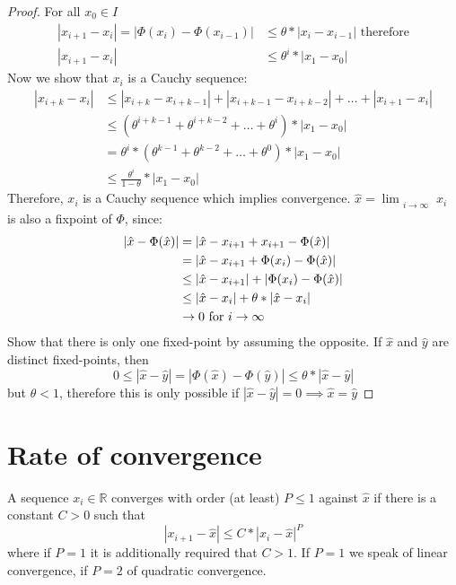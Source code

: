 \begin{proof}
    For all $x_0 \in I$
    \begin{align*}
        |x_{i+1}-x_i|=|\Phi(x_{i})-\Phi(x_{i-1})| &\leq  \theta * |x_i-x_{i-1}| \text{ therefore}\\
        |x_{i+1}-x_i| &\leq \theta^i*|x_1-x_0|
    \end{align*}
    Now we show that $x_i$ is a Cauchy sequence:
    \begin{align*}
        |x_{i+k}-x_i| &\leq |x_{i+k}-x_{i+k-1}|+|x_{i+k-1}-x_{i+k-2}|+\ldots + |x_{i+1}-x_i|\\
        &\leq (\theta^{i+k-1}+\theta^{i+k-2}+\ldots+\theta^i)* |x_1-x_0|\\
        &= \theta^i*(\theta^{k-1}+\theta^{k-2}+\ldots+\theta^{0})*|x_1-x_0| \\
        &\leq \frac{\theta^i}{1-\theta}* |x_1-x_0|
    \end{align*}
    Therefore, $x_i$ is a Cauchy sequence which implies convergence. $\hat{x} = \lim_{\substack{i \to \infty}}x_i$ is also a fixpoint of $\Phi$, since:
    \begin{align*}
        |\hat{x} - \Phi(\hat{x})|&=|\hat{x}-x_{i+1}+x_{i+1}-\Phi(\hat{x})|\\
        & = |\hat{x}-x_{i+1}+\Phi(x_i)-\Phi(\hat{x})|\\
        & \leq |\hat{x}-x_{i+1}| + |\Phi(x_i)-\Phi(\hat{x})|\\
        &  \leq |\hat{x}-x_i|+ \theta * |\hat{x}-x_i|\\
        &\to 0  \hbox{ for } i \to \infty
    \end{align*}
    Show that there is only one fixed-point by assuming the opposite.
    If $\hat{x}$ and $\hat{y}$ are distinct fixed-points, then
    \begin{equation*}
        0 \leq |\hat{x}-\hat{y}| = |\Phi(\hat{x})-\Phi(\hat{y})| \leq \theta * |\hat{x}-\hat{y}|
    \end{equation*}
    but $\theta < 1$, therefore this is only possible if $|\hat{x}- \hat{y}| = 0 \implies \hat{x} = \hat{y}$
\end{proof}


\section{Rate of convergence}\label{sec:rate-of-convergence}
A sequence $x_i \in \mathbb{R}$ converges with order (at least) $P \leq 1$ against $\hat{x}$ if there is a constant $C>0$ such that
\begin{equation*}
    |x_{i+1}-\hat{x}| \leq C * |x_i-\hat{x}|^P
\end{equation*}
where if $P=1$ it is additionally required that $C>1$.
If $P=1$ we speak of linear convergence, if $P=2$ of quadratic convergence.

